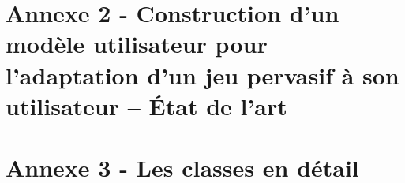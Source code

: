 \documentclass{article}
\begin{document}
\section{Annexe 2 - Construction d’un modèle utilisateur pour l’adaptation d’un jeu pervasif à son utilisateur – État de l’art}\label{ann:eda}

\section{Annexe 3 - Les classes en détail}\label{ann:detailclasse}



\end{document}
